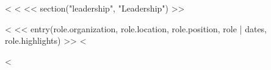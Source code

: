 <%
<%
<< section("leadership", "Leadership") >>
\begin{description}
<%
<< entry(role.organization, role.location, role.position, role | dates, role.highlights) >>
<%
\end{description}

<%
